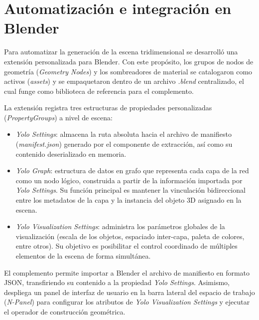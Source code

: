\section{Automatización e integración en Blender}
Para automatizar la generación de la escena tridimensional se desarrolló una extensión 
personalizada para Blender. Con este propósito, los grupos de nodos de geometría 
(\textit{Geometry Nodes}) y los sombreadores de material se catalogaron como activos (\textit{assets}) 
y se empaquetaron dentro de un archivo \textit{.blend} centralizado, el cual funge 
como biblioteca de referencia para el complemento.
\medskip

La extensión registra tres estructuras de propiedades personalizadas (\textit{PropertyGroups}) 
a nivel de escena:
\begin{itemize}
    \item \textit{Yolo Settings}: almacena la ruta absoluta hacia el archivo de manifiesto 
    (\textit{manifest.json}) generado por el componente de extracción, así como su contenido 
    deserializado en memoria.
    \item \textit{Yolo Graph}: estructura de datos en grafo que representa cada capa de la red como 
    un nodo lógico, construida a partir de la información importada por \textit{Yolo Settings}. 
    Su función principal es mantener la vinculación bidireccional entre los metadatos de la capa 
    y la instancia del objeto 3D asignado en la escena.
    \item \textit{Yolo Visualization Settings}: administra los parámetros globales de la visualización 
    (escala de los objetos, espaciado inter-capa, paleta de colores, entre otros). Su objetivo es 
    posibilitar el control coordinado de múltiples elementos de la escena de forma simultánea.
\end{itemize}

El complemento permite importar a Blender el archivo de manifiesto en formato JSON, transfiriendo su 
contenido a la propiedad \textit{Yolo Settings}. Asimismo, despliega un panel de interfaz de usuario 
en la barra lateral del espacio de trabajo (\textit{N-Panel}) para configurar los atributos de 
\textit{Yolo Visualization Settings} y ejecutar el operador de construcción geométrica.
\medskip

